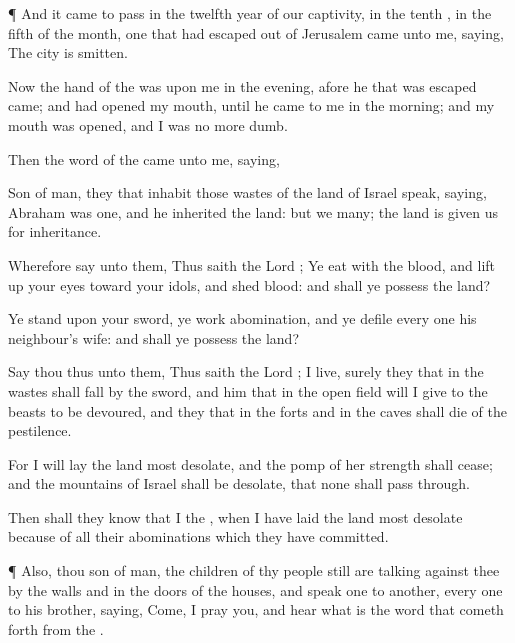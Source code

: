 {\par }{\PP {}¶ And it came to pass in the
twelfth
year of our
captivity, in the
tenth
{}, in the
fifth
{} of the
month,
{} one that had
escaped out of
Jerusalem
came unto me,
saying, The
city is
smitten.

Now the
hand of the
{} was upon me in the
evening,
afore he that was
escaped
came; and had
opened my
mouth, until he
came to me in the
morning; and my
mouth was
opened, and I was no more
dumb.

Then the
word of the
{} came unto me,
saying,

Son of
man, they that
inhabit those
wastes of the
land of
Israel
speak,
saying,
Abraham was
one, and he
inherited the
land: but we
{}
many; the
land is
given us for
inheritance.

Wherefore
say unto them, Thus
saith the
Lord
{}; Ye
eat with the
blood, and lift
up your
eyes toward your
idols, and
shed
blood: and shall ye
possess the
land?

Ye
stand upon your
sword, ye
work
abomination, and ye
defile every
one his
neighbour’s
wife: and shall ye
possess the
land?

Say thou thus unto them, Thus
saith the
Lord
{};
{} I
live, surely they that
{} in the
wastes shall
fall by the
sword, and him that
{} in the
open
field will I
give to the
beasts to be
devoured, and they that
{} in the
forts and in the
caves shall
die of the
pestilence.

For I will
lay the
land
most
desolate, and the
pomp of her
strength shall
cease; and the
mountains of
Israel shall be
desolate, that none shall pass
through.

Then shall they
know that I
{} the
{}, when I have
laid the
land
most
desolate because of all their
abominations which they have
committed.


\par }{\PP {}¶ Also, thou
son of
man, the
children of thy
people still are
talking
against thee by the
walls and in the
doors of the
houses, and
speak
one to
another, every
one to his
brother,
saying,
Come, I pray you, and
hear what is the
word that cometh
forth from the
{}.

}
